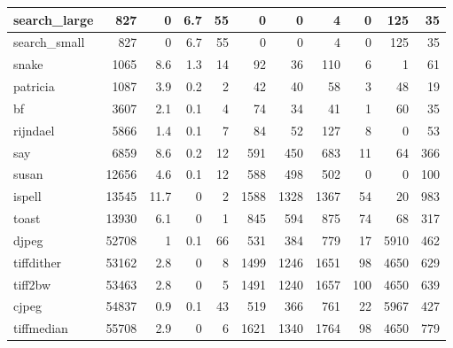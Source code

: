 \begin{tabular}{|l|r|r|r|r|r|r|r|r|r|r|}
\hline
 search\_large    &            827 &      0   &    6.7 &   55 &      0 &          0 &            4 &     0 &   125 &    35 \\
\hline
 search\_small    &            827 &      0   &    6.7 &   55 &      0 &          0 &            4 &     0 &   125 &    35 \\
\hline
 snake           &           1065 &      8.6 &    1.3 &   14 &     92 &         36 &          110 &     6 &     1 &    61 \\
\hline
 patricia        &           1087 &      3.9 &    0.2 &    2 &     42 &         40 &           58 &     3 &    48 &    19 \\
\hline
 bf              &           3607 &      2.1 &    0.1 &    4 &     74 &         34 &           41 &     1 &    60 &    35 \\
\hline
 rijndael        &           5866 &      1.4 &    0.1 &    7 &     84 &         52 &          127 &     8 &     0 &    53 \\
\hline
 say             &           6859 &      8.6 &    0.2 &   12 &    591 &        450 &          683 &    11 &    64 &   366 \\
\hline
 susan           &          12656 &      4.6 &    0.1 &   12 &    588 &        498 &          502 &     0 &     0 &   100 \\
\hline
 ispell          &          13545 &     11.7 &    0   &    2 &   1588 &       1328 &         1367 &    54 &    20 &   983 \\
\hline
 toast           &          13930 &      6.1 &    0   &    1 &    845 &        594 &          875 &    74 &    68 &   317 \\
\hline
 djpeg           &          52708 &      1   &    0.1 &   66 &    531 &        384 &          779 &    17 &  5910 &   462 \\
\hline
 tiffdither      &          53162 &      2.8 &    0   &    8 &   1499 &       1246 &         1651 &    98 &  4650 &   629 \\
\hline
 tiff2bw         &          53463 &      2.8 &    0   &    5 &   1491 &       1240 &         1657 &   100 &  4650 &   639 \\
\hline
 cjpeg           &          54837 &      0.9 &    0.1 &   43 &    519 &        366 &          761 &    22 &  5967 &   427 \\
\hline
 tiffmedian      &          55708 &      2.9 &    0   &    6 &   1621 &       1340 &         1764 &    98 &  4650 &   779 \\
\hline
\end{tabular}


